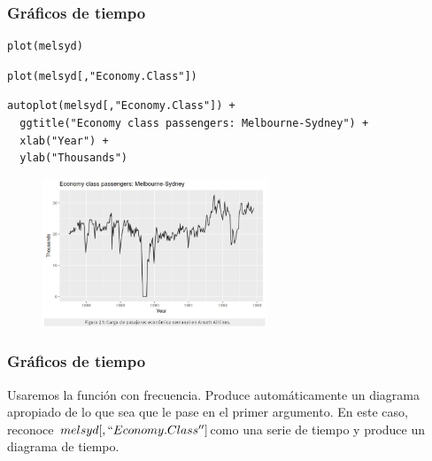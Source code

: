 \documentclass[10pt]{beamer}
\begin{document}
\begin{frame}[fragile]
\frametitle{Gráficos de tiempo}


\lstset{language=r,label= ,caption= ,captionpos=b,numbers=none}
\begin{lstlisting}
plot(melsyd)
\end{lstlisting}

\pause



\lstset{language=r,label= ,caption= ,captionpos=b,numbers=none}
\begin{lstlisting}
plot(melsyd[,"Economy.Class"])
\end{lstlisting}

\pause


\lstset{language=r,label= ,caption= ,captionpos=b,numbers=none}
\begin{lstlisting}
autoplot(melsyd[,"Economy.Class"]) +
  ggtitle("Economy class passengers: Melbourne-Sydney") +
  xlab("Year") +
  ylab("Thousands")
\end{lstlisting}

\pause

\begin{figure}
\begin{center}
    \includegraphics[width=0.6\textwidth]{Imagen13.JPG}
\end{center}
\end{figure}




\end{frame}






\begin{frame}[fragile]
\frametitle{Gráficos de tiempo}

Usaremos la función  con frecuencia. Produce automáticamente un diagrama apropiado de lo que sea que le pase en el primer argumento. En este caso, reconoce $melsyd[,``Economy.Class'']$como una serie de tiempo y produce un diagrama de tiempo.

\end{frame}
\end{document}
